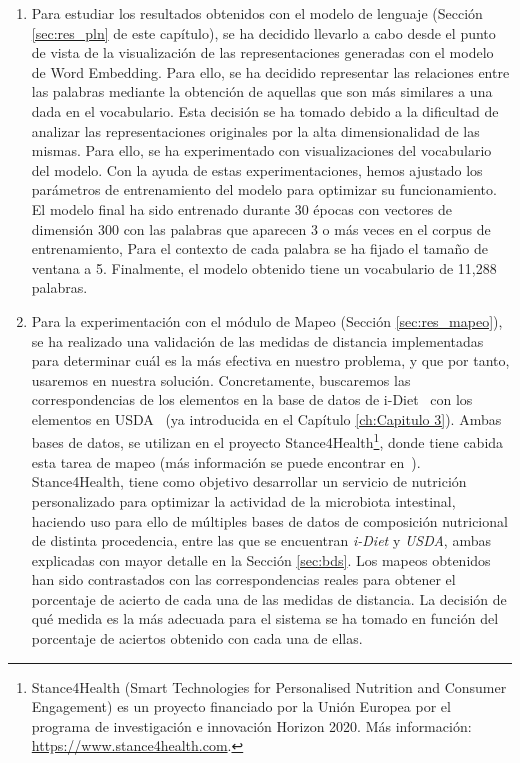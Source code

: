\begin{enumerate}
    \item Para estudiar los resultados obtenidos con el modelo de lenguaje (Sección \ref{sec:res_pln} de este capítulo), se ha decidido llevarlo a cabo desde el punto de vista de la visualización de las representaciones generadas con el modelo de Word Embedding. Para ello, se ha decidido representar las relaciones entre las palabras mediante la obtención de aquellas que son más similares a una dada en el vocabulario. Esta decisión se ha tomado debido a la dificultad de analizar las representaciones originales por la alta dimensionalidad de las mismas. Para ello, se ha experimentado con visualizaciones del vocabulario del modelo. Con la ayuda de estas experimentaciones, hemos ajustado los parámetros de entrenamiento del modelo para optimizar su funcionamiento. El modelo final ha sido entrenado durante 30 épocas con vectores de dimensión 300 con las palabras que aparecen 3 o más veces en el corpus de entrenamiento, Para el contexto de cada palabra se ha fijado el tamaño de ventana a 5. Finalmente, el modelo obtenido tiene un vocabulario de 11,288 palabras.
    
    \item Para la experimentación con el módulo de Mapeo (Sección \ref{sec:res_mapeo}), se ha realizado una validación de las medidas de distancia implementadas para determinar cuál es la más efectiva en nuestro problema, y que por tanto, usaremos en nuestra solución. Concretamente, buscaremos las correspondencias de los elementos en la base de datos de i-Diet~\cite{iDietrf} con los elementos en USDA~\cite{gebhardt2008usda} (ya introducida en el Capítulo \ref{ch:Capitulo 3}). Ambas bases de datos, se utilizan en el proyecto Stance4Health\footnote{Stance4Health (Smart Technologies for Personalised Nutrition and Consumer Engagement) es un proyecto financiado por la Unión Europea por el programa de investigación e innovación Horizon 2020. Más información: \url{https://www.stance4health.com}.}, donde tiene cabida esta tarea de mapeo (más información se puede encontrar en~\cite{morales2020word}). Stance4Health, tiene como objetivo desarrollar un servicio de nutrición personalizado para optimizar la actividad de la microbiota intestinal, haciendo uso para ello de múltiples bases de datos de composición nutricional de distinta procedencia, entre las que se encuentran \textit{i-Diet} y \textit{USDA}, ambas explicadas con mayor detalle en la Sección \ref{sec:bds}. Los mapeos obtenidos han sido contrastados con las correspondencias reales para obtener el porcentaje de acierto de cada una de las medidas de distancia. La decisión de qué medida es la más adecuada para el sistema se ha tomado en función del porcentaje de aciertos obtenido con cada una de ellas.
    

\end{enumerate}
